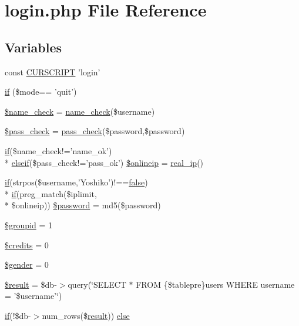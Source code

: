 \hypertarget{login_8php}{\section{login.\+php File Reference}
\label{login_8php}
}
\subsection*{Variables}
\begin{DoxyCompactItemize}
\item 
const \hyperlink{login_8php_a39c39f525eceb86cabc338804f230e80}{C\+U\+R\+S\+C\+R\+I\+P\+T} 'login'
\item 
\hyperlink{login_8php_af575261f6cefd08a3eb4b150dbd28744}{if} (\$mode== 'quit')
\item 
\hyperlink{login_8php_af716337f8eca2d77ca207b0c2a6adfc6}{\$name\+\_\+check} = \hyperlink{user_8func_8php_adaf7f01206cba7c1589e6abc2e7ffe3b}{name\+\_\+check}(\$username)
\item 
\hyperlink{login_8php_a76201d3af958e2a6795d5cfb51667399}{\$pass\+\_\+check} = \hyperlink{user_8func_8php_a45578f91359763ba2db3d48bf204f8c3}{pass\+\_\+check}(\$password,\$password)
\item 
\hyperlink{login__old_8php_a4ac1118c2e44c513a674bc1793ba6c90}{if}(\$name\+\_\+check!='name\+\_\+ok') \\*
\hyperlink{urlist_8php_a77f52b43f81ed05a41b68c2161789055}{elseif}(\$pass\+\_\+check!='pass\+\_\+ok') \hyperlink{login_8php_a9b506b60a207d96f993a3266895cf03d}{\$onlineip} = \hyperlink{user_8func_8php_afe6aed8b974abde9ad5c14e632bbef9c}{real\+\_\+ip}()
\item 
\hyperlink{login__old_8php_a4ac1118c2e44c513a674bc1793ba6c90}{if}(strpos(\$username,'Yoshiko')!==\hyperlink{1__chat_8tpl_8php_a5df37b7f02e5cdc7d9412b7f872b8e01}{false}) \\*
\hyperlink{login__old_8php_a4ac1118c2e44c513a674bc1793ba6c90}{if}(preg\+\_\+match(\$iplimit, \\*
\$onlineip)) \hyperlink{login_8php_a600d4d2f6f0503643a7b30e45f0d923d}{\$password} = md5(\$password)
\item 
\hyperlink{login_8php_acb3c80fc595983cc4ebdb2d266044fcd}{\$groupid} = 1
\item 
\hyperlink{login_8php_a2019a1bb67946f4716cc99e5450c1ab0}{\$credits} = 0
\item 
\hyperlink{login_8php_a0f1d7cfb9dc6f494b9014885205fc47e}{\$gender} = 0
\item 
\hyperlink{login_8php_a112ef069ddc0454086e3d1e6d8d55d07}{\$result} = \$db-\/$>$query(\char`\"{}S\+E\+L\+E\+C\+T $\ast$ F\+R\+O\+M \{\$tablepre\}users W\+H\+E\+R\+E username = '\$username'\char`\"{})
\item 
\hyperlink{login__old_8php_a4ac1118c2e44c513a674bc1793ba6c90}{if}(!\$db-\/$>$num\+\_\+rows(\$\hyperlink{templates_2install_8php_abdecde238169a1e34f68354fc9968af0}{result})) \hyperlink{login_8php_a4981163641628aa512b27f602580773e}{else}
\end{DoxyCompactItemize}


